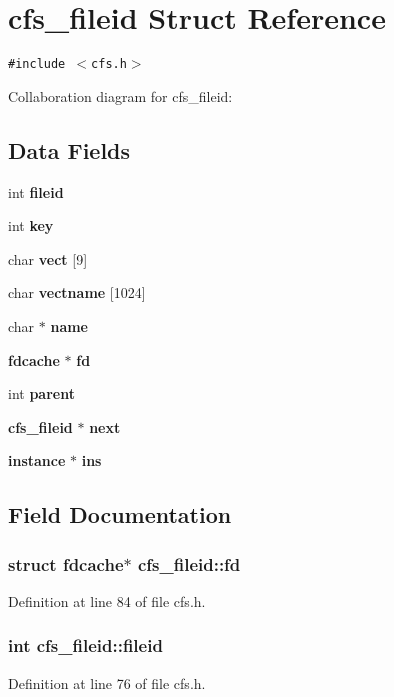 \section{cfs\_\-fileid Struct Reference}
\label{structcfs__fileid}
{\tt \#include $<$cfs.h$>$}

Collaboration diagram for cfs\_\-fileid:\subsection*{Data Fields}
\begin{CompactItemize}
\item 
int {\bf fileid}
\item 
int {\bf key}
\item 
char {\bf vect} [9]
\item 
char {\bf vectname} [1024]
\item 
char $\ast$ {\bf name}
\item 
{\bf fdcache} $\ast$ {\bf fd}
\item 
int {\bf parent}
\item 
{\bf cfs\_\-fileid} $\ast$ {\bf next}
\item 
{\bf instance} $\ast$ {\bf ins}
\end{CompactItemize}


\subsection{Field Documentation}
\subsubsection{\setlength{\rightskip}{0pt plus 5cm}struct {\bf fdcache}$\ast$ {\bf cfs\_\-fileid::fd}}\label{structcfs__fileid_o5}




Definition at line 84 of file cfs.h.
\subsubsection{\setlength{\rightskip}{0pt plus 5cm}int {\bf cfs\_\-fileid::fileid}}\label{structcfs__fileid_o0}




Definition at line 76 of file cfs.h.
